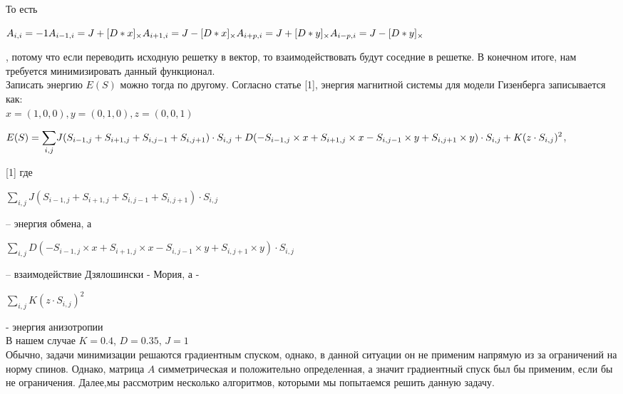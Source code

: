 \documentclass[ 12pt,x11names]{article}
\begin{document}
    То есть  \begin{center} $A_{i, i} = -1 \\ A_{i - 1, i} =  J + [D*x]_\times \\
    A_{i+1, i} =  J - [D*x]_\times \\
    A_{i + p, i} =  J + [D*y]_\times \\
    A_{i - p , i} =  J -  [D*y]_\times$
     \end{center}, потому что если переводить исходную решетку в вектор, то взаимодействовать будут соседние в решетке.
    В конечном итоге, нам требуется минимизировать данный функционал.\\
    Записать энергию $E(S)$ можно тогда по другому.
    Согласно статье [1], энергия магнитной системы для модели Гизенберга записывается как:\\
    $x = (1,0, 0), y = (0,1, 0), z =(0, 0 , 1)$\\
        \begin{center}
    $E(S) = \displaystyle{\sum_{i, j}}  J (S_{i - 1, j} + S_{i + 1, j} + S_{i, j - 1} + S_{i, j + 1}) \cdot S_{i,j} + \\
    D  (-S_{i - 1, j} \times x  + S_{i + 1, j} \times x - S_{i, j - 1} \times y + S_{i, j + 1} \times y)\cdot S_{i,j}
    + \\
    K  (z \cdot S_{i,j}) ^ 2$,\\
    \end{center}[1]
    где
     \begin{center}
    $\displaystyle{\sum_{i, j}} J (S_{i - 1, j} + S_{i + 1, j} + S_{i, j - 1} + S_{i, j + 1}) \cdot S_{i,j}$\end{center} -- энергия обмена, а \begin{center}
    $\displaystyle{\sum_{i, j}} D  (-S_{i - 1, j} \times x  + S_{i + 1, j} \times x - S_{i, j - 1} \times y + S_{i, j + 1} \times y)\cdot S_{i,j}$\end{center}  -- взаимодействие Дзялошински - Мория, а - \begin{center}
    $\displaystyle{\sum_{i, j}} K  (z \cdot S_{i,j}) ^ 2$\end{center} - энергия анизотропии\\
    В нашем случае $K = 0.4$, $D = 0.35$, $J = 1$\\
    Обычно, задачи минимизации решаются градиентным спуском, однако, в данной ситуации он не применим напрямую из за ограничений на норму спинов.
    Однако, матрица $A$ симметрическая и положительно определенная, а значит градиентный спуск был бы применим, если бы не ограничения.
    Далее,мы рассмотрим несколько алгоритмов, которыми мы попытаемся решить данную задачу.
    \newpage
\end{document}
